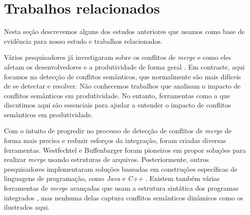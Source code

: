 \section{Trabalhos relacionados}
Nesta seção descrevemos alguns dos estudos anteriores que usamos como base de evidência para nosso estudo e trabalhos relacionados.

Vários pesquisadores já investigaram sobre os conflitos de \emph{merge} e como eles afetam os desenvolvedores e a produtividade de forma geral \cite{10.1145/383876.383878, 4228648, Sarma, Bird2012AssessingTV, 8094445, 6915251, 9625780, 10.5555/1781794.1781836}. Em contraste, aqui focamos na detecção de conflitos semânticos, que normalmente são mais difíceis de se detectar e resolver. Não conhecemos trabalhos que analisam o impacto de conflitos semânticos em produtividade. No entanto, ferramentas como a que discutimos aqui são essenciais para ajudar a entender o impacto de conflitos semânticos em produtividade.


Com o intuito de progredir no processo de detecção de conflitos de \emph{merge} de forma mais precisa e reduzir esforços da integração, foram criadas diversas ferramentas. Westfechtel \cite{10.1145/111062.111071} e Buffenbarger \cite{Buffenbarger} foram pioneiros em propor soluções para realizar \emph{merge} usando estruturas de arquivos. Posteriormente, outros pesquisadores implementaram soluções baseadas em construções específicas de linguagens de programação, como \emph{Java} \cite{10.1007/s10515-006-0002-0} e \emph{C++} \cite{Cdiff}.
Existem também várias ferramentas de \emph{merge} avançadas que usam a estrutura sintática dos programas integrados \cite{10.1145/2025113.2025141, 7321191, 10.1145/3133883, 8952450, 6494912, 10.1109/ICSE-Companion.2019.00117, 10.1109/ASE.2019.00097, 10.1145/3474624.3474646}, mas nenhuma delas captura conflitos semânticos dinâmicos como os ilustrados aqui.

